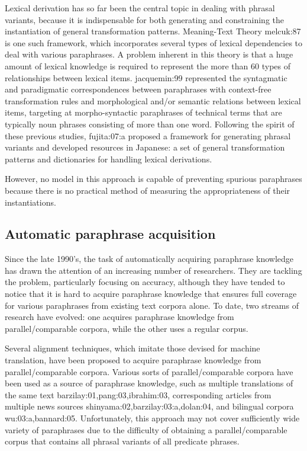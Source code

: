 \documentclass[english]{jnlp_1.4}
\renewcommand{\cite}{}
\newcommand{\newcite}{}
\begin{document}
Lexical derivation has so far been the central topic in dealing with
phrasal variants, because it is indispensable for both generating and
constraining the instantiation of general transformation patterns.
Meaning-Text Theory \cite{melcuk:87} is one such framework, which
incorporates several types of lexical dependencies to deal with
various paraphrases.  A problem inherent in this theory is that a huge
amount of lexical knowledge is required to represent the more than 60
types of relationships between lexical items.
\newcite{jacquemin:99} represented the syntagmatic and paradigmatic
correspondences between paraphrases with context-free transformation
rules and morphological and/or semantic relations between lexical
items, targeting at morpho-syntactic paraphrases of technical terms
that are typically noun phrases consisting of more than one word.
Following the spirit of these previous studies, \newcite{fujita:07:a}
proposed a framework for generating phrasal variants and developed
resources in Japanese: a set of general transformation patterns and
dictionaries for handling lexical derivations.

However, no model in this approach is capable of preventing spurious
paraphrases because there is no practical method of measuring the
appropriateness of their instantiations.

\subsection{Automatic paraphrase acquisition}
\label{ssec:acquisition}

Since the late 1990's, the task of automatically acquiring paraphrase
knowledge has drawn the attention of an increasing number of
researchers.  They are tackling the problem, particularly focusing on
accuracy, although they have tended to notice that it is hard to
acquire paraphrase knowledge that ensures full coverage for various
paraphrases from existing text corpora alone.
To date, two streams of research have evolved: one acquires paraphrase
knowledge from parallel/comparable corpora, while the other uses a
regular corpus.

Several alignment techniques, which imitate those devised for machine
translation, have been proposed to acquire paraphrase knowledge from
parallel/comparable corpora.
Various sorts of parallel/comparable corpora have been used as a
source of paraphrase knowledge, such as multiple translations of the
same text \cite{barzilay:01,pang:03,ibrahim:03}, corresponding
articles from multiple news sources
\cite{shinyama:02,barzilay:03:a,dolan:04}, and bilingual corpora
\cite{wu:03:a,bannard:05}.
Unfortunately, this approach may not cover sufficiently wide variety
of paraphrases due to the difficulty of obtaining a
parallel/comparable corpus that contains all phrasal variants of all
predicate phrases.
\end{document}
